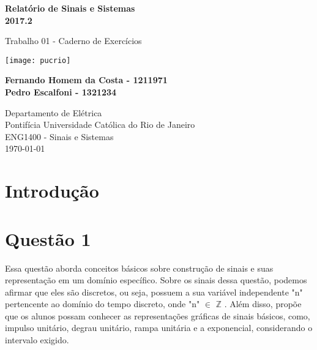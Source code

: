 \documentclass[12pt,a4paper]{report}
\begin{document}
\begin{titlepage}
	\begin{center}
		\vspace*{1cm}

		\Huge
		\textbf{Relatório de Sinais e Sistemas}\\
		\Large
		\textbf{2017.2}

		\vspace{0.5cm}
		\Large
		Trabalho 01 - Caderno de Exercícios

		\vspace{1.5cm}

		\texttt{[image: pucrio]}

		\vspace{1.5cm}

		\normalsize
		\textbf{Fernando Homem da Costa - 1211971}\\
		\textbf{Pedro Escalfoni - 1321234}

		\vfill

		\Large
		Departamento de Elétrica\\
		Pontifícia Universidade Católica do Rio de Janeiro\\
		ENG1400 - Sinais e Sistemas\\
		\today

	\end{center}
\end{titlepage}

\tableofcontents
\newpage

\section{Introdução}



\section{Questão 1}
Essa questão aborda conceitos básicos sobre construção de sinais e suas representação em um domínio específico. Sobre os sinais dessa questão, podemos afirmar que eles são discretos, ou seja, possuem a sua variável independente "n" pertencente ao domínio do tempo discreto, onde "n" $\in$  $\mathbb{Z}$ . Além disso, propõe que os alunos possam conhecer as representações gráficas de sinais básicos, como, impulso unitário, degrau unitário, rampa unitária e a exponencial, considerando o intervalo exigido.
\end{document}
